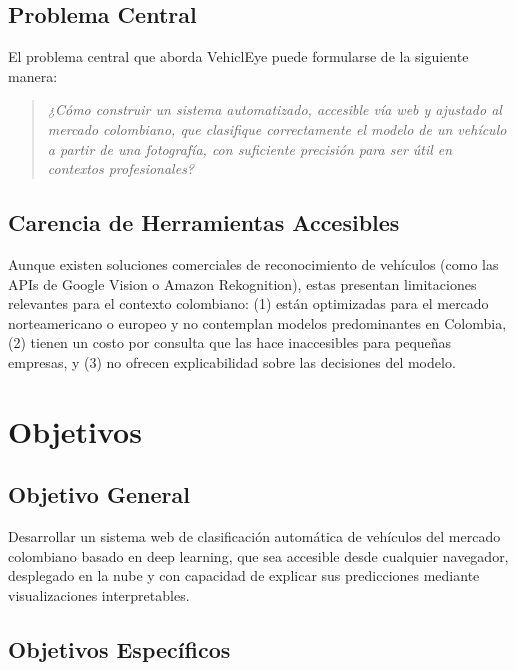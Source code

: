 \documentclass[12pt,a4paper]{article}
\begin{document}
\subsection{Problema Central}

El problema central que aborda VehiclEye puede formularse de la siguiente manera:

\begin{quote}
\textit{¿Cómo construir un sistema automatizado, accesible vía web y ajustado al mercado colombiano, que clasifique correctamente el modelo de un vehículo a partir de una fotografía, con suficiente precisión para ser útil en contextos profesionales?}
\end{quote}

\subsection{Carencia de Herramientas Accesibles}

Aunque existen soluciones comerciales de reconocimiento de vehículos (como las APIs de Google Vision o Amazon Rekognition), estas presentan limitaciones relevantes para el contexto colombiano: (1) están optimizadas para el mercado norteamericano o europeo y no contemplan modelos predominantes en Colombia, (2) tienen un costo por consulta que las hace inaccesibles para pequeñas empresas, y (3) no ofrecen explicabilidad sobre las decisiones del modelo.

\section{Objetivos}

\subsection{Objetivo General}

Desarrollar un sistema web de clasificación automática de vehículos del mercado colombiano basado en deep learning, que sea accesible desde cualquier navegador, desplegado en la nube y con capacidad de explicar sus predicciones mediante visualizaciones interpretables.

\subsection{Objetivos Específicos}
\end{document}
